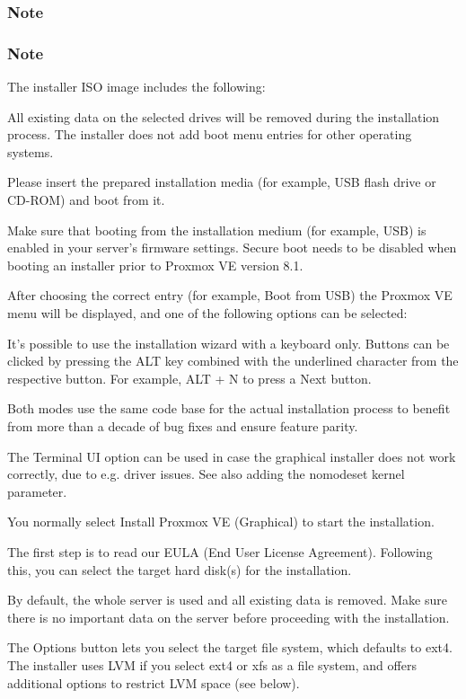 \subsubsection{Note}

\subsubsection{Note}

The installer ISO image includes the following:

All existing data on the selected drives will be removed during the installation process. The installer does not add boot menu entries for other operating systems.

Please insert the prepared installation media (for example, USB flash drive or CD-ROM) and boot from it.

Make sure that booting from the installation medium (for example, USB) is enabled in your server’s firmware settings. Secure boot needs to be disabled when booting an installer prior to Proxmox VE version 8.1.

After choosing the correct entry (for example, Boot from USB) the Proxmox VE menu will be displayed, and one of the following options can be selected:

It’s possible to use the installation wizard with a keyboard only. Buttons can be clicked by pressing the ALT key combined with the underlined character from the respective button. For example, ALT + N to press a Next button.

Both modes use the same code base for the actual installation process to benefit from more than a decade of bug fixes and ensure feature parity.

The Terminal UI option can be used in case the graphical installer does not work correctly, due to e.g. driver issues. See also adding the nomodeset kernel parameter.

You normally select Install Proxmox VE (Graphical) to start the installation.

The first step is to read our EULA (End User License Agreement). Following this, you can select the target hard disk(s) for the installation.

By default, the whole server is used and all existing data is removed. Make sure there is no important data on the server before proceeding with the installation.

The Options button lets you select the target file system, which defaults to ext4. The installer uses LVM if you select ext4 or xfs as a file system, and offers additional options to restrict LVM space (see below).

